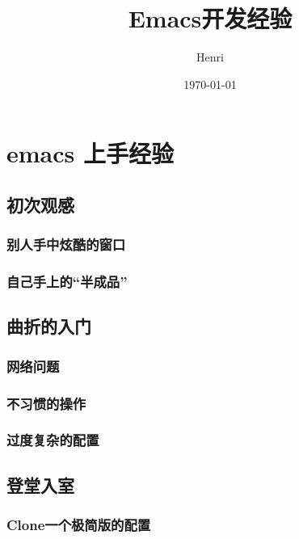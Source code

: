 \documentclass[11pt]{article}
\author{Henri}
\date{\today}
\title{Emacs开发经验}
\begin{document}
\maketitle
\tableofcontents


\section{emacs 上手经验}
\label{sec:org2ba5624}
\subsection{初次观感}
\label{sec:org11d2d8a}
\subsubsection{别人手中炫酷的窗口}
\label{sec:org3b6827e}



\subsubsection{自己手上的“半成品”}
\label{sec:org91b4058}




\subsection{曲折的入门}
\label{sec:org5221043}
\subsubsection{网络问题}
\label{sec:org922315a}

\subsubsection{不习惯的操作}
\label{sec:org7db86d9}

\subsubsection{过度复杂的配置}
\label{sec:org9e5a97e}


\subsection{登堂入室}
\label{sec:orgac9c25f}

\subsubsection{Clone一个极简版的配置}
\label{sec:org05e565f}
\end{document}

